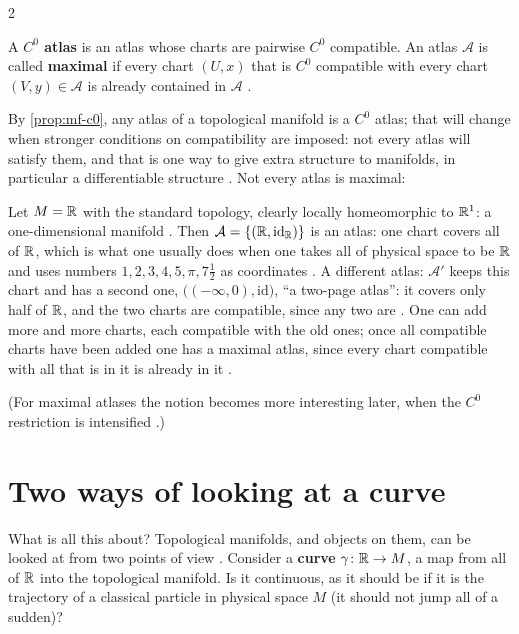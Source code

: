 \begin{paracol}{2}
\begin{definition}\label{def:mf-c0atlas}
A \textbf{$C^0$ atlas} is an atlas whose charts are pairwise $C^0$ compatible. An atlas $\mathcal A$ is called \textbf{maximal} if every chart $(U,x)$ that is $C^0$ compatible with every chart $(V,y)\in\mathcal A$ is already contained in $\mathcal A$
.
\end{definition}
By \cref{prop:mf-c0}, any atlas of a topological manifold is a $C^0$ atlas; that will change when stronger conditions on compatibility are imposed: not every atlas will satisfy them, and that is one way to give extra structure to manifolds, in particular a differentiable
structure . Not every atlas is maximal:

\begin{example}\label{ex:mf-atlases}
Let $M=\mathbb{R}$ with the standard topology, clearly locally homeomorphic to $\mathbb{R}^1$: a one-dimensional manifold . Then $\mathcal A=\{(\mathbb{R},\mathrm{id}_{\mathbb{R}})\}$ is an atlas: one chart covers all of $\mathbb{R}$, which is what one usually does when
one takes all of physical space to be $\mathbb{R}$ and uses numbers $1,2,3,4,5,\pi,7\tfrac12$ as coordinates . A different atlas: $\mathcal A'$ keeps this chart and has a second one, $\bigl((-\infty,0),\mathrm{id}\bigr)$,
``a two-page atlas'': it covers only half of $\mathbb{R}$, and the two charts are compatible, since any two are . One can add more and more charts, each compatible with the old ones; once all
compatible charts have been added one has a maximal atlas, since every chart compatible with all that is in it is already in it .
\end{example}
(For maximal atlases the notion becomes more interesting later, when the $C^0$ restriction is intensified .)

\section{Two ways of looking at a curve}\label{sec:mf-curve}

What is all this about? Topological manifolds, and objects on them, can be looked at from two points of view . Consider a \textbf{curve} $\gamma\colon\mathbb{R}\to M$, a map from all of $\mathbb{R}$ into the topological manifold. Is it continuous, as it should be
if it is the trajectory of a classical particle in physical space $M$ (it should not jump all of a sudden)? 


\end{paracol}
